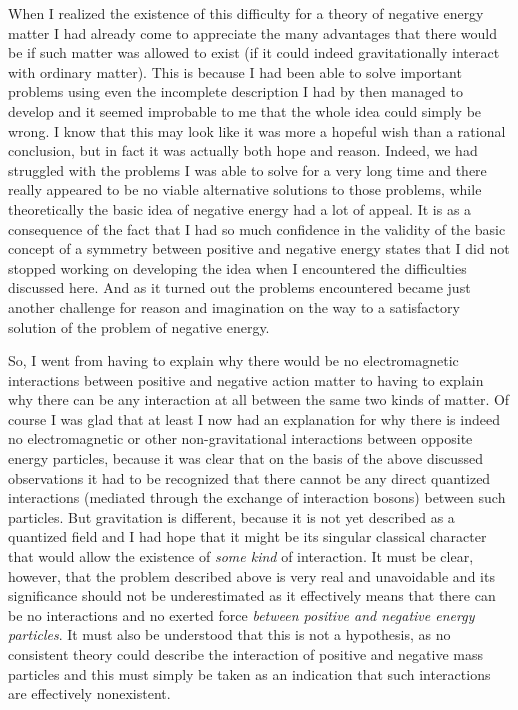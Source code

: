 \documentclass[notitlepage,12pt]{report}
\begin{document}
When I realized the existence of this difficulty for a theory of negative energy matter I had already come to appreciate the many advantages that there would be if such matter was allowed to exist (if it could indeed gravitationally interact with ordinary matter). This is because I had been able to solve important problems using even the incomplete description I had by then managed to develop and it seemed improbable to me that the whole idea could simply be wrong. I know that this may look like it was more a hopeful wish than a rational conclusion, but in fact it was actually both hope and reason. Indeed, we had struggled with the problems I was able to solve for a very long time and there really appeared to be no viable alternative solutions to those problems, while theoretically the basic idea of negative energy had a lot of appeal. It is as a consequence of the fact that I had so much confidence in the validity of the basic concept of a symmetry between positive and negative energy states that I did not stopped working on developing the idea when I encountered the difficulties discussed here. And as it turned out the problems encountered became just another challenge for reason and imagination on the way to a satisfactory solution of the problem of negative energy.

So, I went from having to explain why there would be no electromagnetic interactions between positive and negative action matter to having to explain why there can be any interaction at all between the same two kinds of matter. Of course I was glad that at least I now had an explanation for why there is indeed no electromagnetic or other non-gravitational interactions between opposite energy particles, because it was clear that on the basis of the above discussed observations it had to be recognized that there cannot be any direct quantized interactions (mediated through the exchange of interaction bosons) between such particles. But gravitation is different, because it is not yet described as a quantized field and I had hope that it might be its singular classical character that would allow the existence of \textit{some kind} of interaction. It must be clear, however, that the problem described above is very real and unavoidable and its significance should not be underestimated as it effectively means that there can be no interactions and no exerted force \textit{between positive and negative energy particles}. It must also be understood that this is not a hypothesis, as no consistent theory could describe the interaction of positive and negative mass particles and this must simply be taken as an indication that such interactions are effectively nonexistent.
\end{document}
